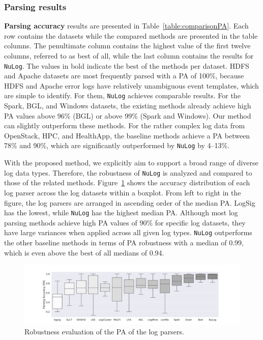 \subsubsection{Parsing results}

\textbf{Parsing accuracy} results are presented in Table~\ref{table:comparisonPA}. Each row contains the datasets while the compared methods are presented in the table columns. The penultimate column contains the highest value of the first twelve columns, referred to as best of all, while the last column contains the results for \texttt{NuLog}. The values in bold indicate the best of the methods per dataset. HDFS and Apache datasets are most frequently parsed with a PA of 100\%, because HDFS and Apache error logs have relatively unambiguous event templates, which are simple to identify. For them, \texttt{NuLog} achieves comparable results. For the Spark, BGL, and Windows datasets, the existing methods already achieve high PA values above 96\% (BGL) or above 99\% (Spark and Windows). Our method can slightly outperform these methods. For the rather complex log data from OpenStack, HPC, and HealthApp, the baseline methods achieve a PA between 78\% and 90\%, which are significantly outperformed by \texttt{NuLog} by 4--13\%.

With the proposed method, we explicitly aim to support a broad range of diverse log data types. Therefore, the robustness of \texttt{NuLog} is analyzed and compared to those of the related methods. Figure~\ref{robustness_pa} shows the accuracy distribution of each log parser across the log datasets within a boxplot. From left to right in the figure, the log parsers are arranged in ascending order of the median PA. LogSig has the lowest, while \texttt{NuLog} has the highest median PA. Although most log parsing methods achieve high PA values of 90\% for specific log datasets, they have large variances when applied across all given log types. \texttt{NuLog} outperforms the other baseline methods in terms of PA robustness with a median of 0.99, which is even above the best of all medians of 0.94.

\begin{figure}[!t]
\centerline{\includegraphics[width=1.0\textwidth]{gfx/chap4/robustness.pdf}}
\caption{Robustness evaluation of the PA of the log parsers.}
\label{robustness_pa}
\end{figure}


